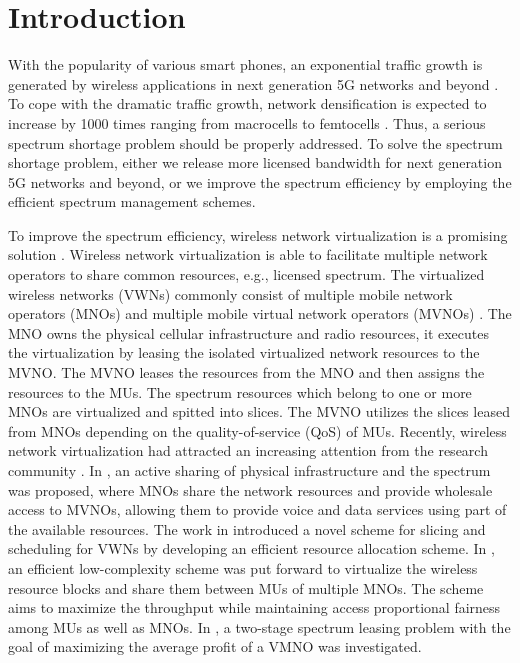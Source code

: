 \documentclass[journal]{IEEEtran}
\begin{document}
\section{Introduction}

With the popularity of various smart phones, an exponential traffic growth is generated by wireless applications in next generation 5G networks and beyond \cite{NPanwar}. To cope with the dramatic traffic growth, network densification is expected to increase by 1000 times ranging from macrocells to femtocells \cite{AYDing}. Thus, a serious spectrum shortage problem should be properly addressed. To solve the spectrum shortage problem, either we release more licensed bandwidth for next generation 5G networks and beyond, or we improve the spectrum efficiency by employing the efficient spectrum management schemes.

To improve the spectrum efficiency, wireless network virtualization is a promising solution \cite{CLiang,LZhao,3GPP}. Wireless network virtualization is able to facilitate multiple network operators to share common resources, e.g., licensed spectrum. The virtualized wireless networks (VWNs) commonly consist of multiple mobile network operators (MNOs) and multiple mobile virtual network operators (MVNOs) \cite{RKokku}. The MNO owns the physical cellular infrastructure and radio resources, it executes the virtualization by leasing the isolated virtualized network resources to the MVNO. The MVNO leases the resources from the MNO and then assigns the resources to the MUs. The spectrum resources which belong to one or more MNOs are virtualized and spitted into slices. The MVNO utilizes the slices leased from MNOs depending on the quality-of-service (QoS) of MUs. Recently, wireless network virtualization had attracted an increasing attention from the research community \cite{XCostaPerez,MIKamel,MKalil,YXZhang}. In \cite{XCostaPerez}, an active sharing of physical infrastructure and the spectrum was proposed, where MNOs share the network resources and provide wholesale access to MVNOs, allowing them to provide voice and data services using part of the available resources. The work in \cite{MIKamel} introduced a novel scheme for slicing and scheduling for VWNs by developing an efficient resource allocation scheme. In \cite{MKalil}, an efficient low-complexity scheme was put forward to virtualize the wireless resource blocks and share them between MUs of multiple MNOs. The scheme aims to maximize the throughput while maintaining access proportional fairness among MUs as well as MNOs. In \cite{YXZhang}, a two-stage spectrum leasing problem with the goal of maximizing the average profit of a VMNO was investigated.
\end{document}
